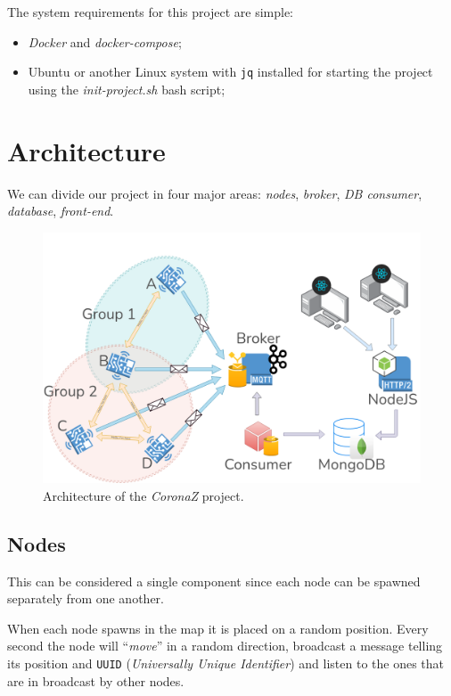 \documentclass[conference]{IEEEtran}
\begin{document}
		The system requirements for this project are simple:
		\begin{itemize}
			\item \textit{Docker} and \textit{docker-compose};
			\item Ubuntu or another Linux system with \texttt{jq} installed for starting the project using the \textit{init-project.sh} bash script;
		\end{itemize}

\section{Architecture}\label{sec:architecture}
	
	We can divide our project in four major areas: \textit{nodes}, \textit{broker}, \textit{DB consumer}, \textit{database}, \textit{front-end}.

	\begin{figure}[htbp]
		\centerline{\includegraphics[width=\linewidth]{img/coronaz.png}}
		\caption{Architecture of the \textit{CoronaZ} project.}
		\label{fig:architecture}
	\end{figure}
	
	\subsection{Nodes}
	
		This can be considered a single component since each node can be spawned separately from one another.
		
		When each node spawns in the map it is placed on a random position.
		Every second the node will ``\textit{move}'' in a random direction, broadcast a message telling its position and \texttt{UUID} (\textit{Universally Unique Identifier}) and listen to the ones that are in broadcast by other nodes.
		
\end{document}
